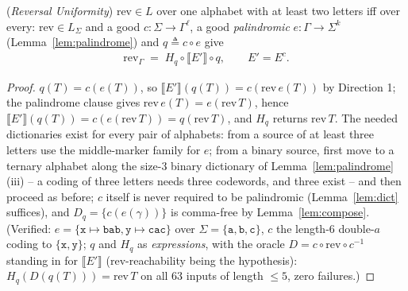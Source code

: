\begin{theorem}
    (\emph{Reversal Uniformity})
    \label{thm:rev-uniform}
    $\mathrm{rev} \in L$ over one alphabet with at least two letters iff
    over every: $\mathrm{rev} \in L_\Sigma$ and a good $c : \Sigma
    \rightarrow \Gamma^\ell$, a good \emph{palindromic} $e : \Gamma
    \rightarrow \Sigma^k$ (Lemma~\ref{lem:palindrome}) and $q \triangleq c
    \circ e$ give
    \begin{align}
        \mathrm{rev}_\Gamma \;=\; H_q \circ \llbracket E' \rrbracket
        \circ q, \qquad E' = E^c .
    \end{align}
\end{theorem}

\begin{proof}
    $q(T) = c(e(T))$, so $\llbracket E' \rrbracket(q(T)) = c(\mathrm{rev}
    \, e(T))$ by Direction 1; the palindrome clause gives
    $\mathrm{rev}\, e(T) = e(\mathrm{rev}\, T)$, hence
    $\llbracket E' \rrbracket(q(T)) = c(e(\mathrm{rev}\,T)) = q(\mathrm{rev}
    \,T)$, and $H_q$ returns $\mathrm{rev}\,T$. The needed dictionaries
    exist for every pair of alphabets: from a source of at least three
    letters use the middle-marker family for $e$; from a binary source,
    first move to a ternary alphabet along the size-3 binary dictionary of
    Lemma~\ref{lem:palindrome}(iii) -- a coding of three letters needs
    three codewords, and three exist -- and then proceed as before; $c$
    itself is never required to be palindromic (Lemma~\ref{lem:dict}
    suffices), and $D_q = \{c(e(\gamma))\}$ is comma-free by
    Lemma~\ref{lem:compose}. (Verified: $e = \{\mathtt{x} \mapsto
    \mathtt{bab}, \mathtt{y} \mapsto \mathtt{cac}\}$ over $\Sigma = \{
    \mathtt{a},\mathtt{b},\mathtt{c}\}$, $c$ the length-6 double-$a$ coding
    to $\{\mathtt{x},\mathtt{y}\}$; $q$ and $H_q$ as \emph{expressions},
    with the oracle $D = c \circ \mathrm{rev} \circ c^{-1}$ standing in for
    $\llbracket E' \rrbracket$ ($\mathrm{rev}$-reachability being the
    hypothesis): $H_q(D(q(T))) = \mathrm{rev}\,T$ on all 63 inputs of
    length $\le 5$, zero failures.)
\end{proof}

